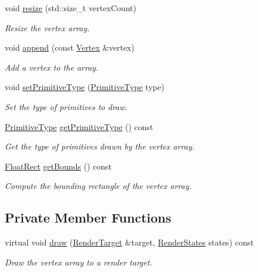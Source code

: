 \begin{DoxyCompactItemize}
void \mbox{\hyperlink{classsf_1_1_vertex_array_a0c0fe239e8f9a54e64d3bbc96bf548c0}{resize}} (std\+::size\+\_\+t vertex\+Count)
\begin{DoxyCompactList}\small\item\em Resize the vertex array. \end{DoxyCompactList}\item 
void \mbox{\hyperlink{classsf_1_1_vertex_array_a80c8f6865e53bd21fc6cb10fffa10035}{append}} (const \mbox{\hyperlink{classsf_1_1_vertex}{Vertex}} \&vertex)
\begin{DoxyCompactList}\small\item\em Add a vertex to the array. \end{DoxyCompactList}\item 
void \mbox{\hyperlink{classsf_1_1_vertex_array_aa38c10707c28a97f4627ae8b2f3ad969}{set\+Primitive\+Type}} (\mbox{\hyperlink{group__graphics_ga5ee56ac1339984909610713096283b1b}{Primitive\+Type}} type)
\begin{DoxyCompactList}\small\item\em Set the type of primitives to draw. \end{DoxyCompactList}\item 
\mbox{\hyperlink{group__graphics_ga5ee56ac1339984909610713096283b1b}{Primitive\+Type}} \mbox{\hyperlink{classsf_1_1_vertex_array_aa1a60d84543aa6e220683349b645f130}{get\+Primitive\+Type}} () const
\begin{DoxyCompactList}\small\item\em Get the type of primitives drawn by the vertex array. \end{DoxyCompactList}\item 
\mbox{\hyperlink{classsf_1_1_rect}{Float\+Rect}} \mbox{\hyperlink{classsf_1_1_vertex_array_abd57744c732abfc7d4c98d8e1d4ccca1}{get\+Bounds}} () const
\begin{DoxyCompactList}\small\item\em Compute the bounding rectangle of the vertex array. \end{DoxyCompactList}\end{DoxyCompactItemize}
\subsection*{Private Member Functions}
\begin{DoxyCompactItemize}
\item 
virtual void \mbox{\hyperlink{classsf_1_1_vertex_array_aa461f084e4a65fabfa4992885dabbea6}{draw}} (\mbox{\hyperlink{classsf_1_1_render_target}{Render\+Target}} \&target, \mbox{\hyperlink{classsf_1_1_render_states}{Render\+States}} states) const
\begin{DoxyCompactList}\small\item\em Draw the vertex array to a render target. \end{DoxyCompactList}\end{DoxyCompactItemize}
